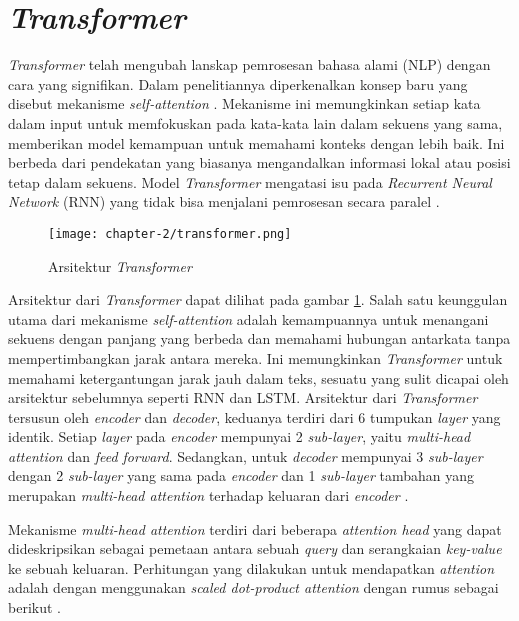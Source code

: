 \section{\textit{Transformer}}
\label{sec:transformer}

\textit{Transformer} telah mengubah lanskap pemrosesan bahasa alami (NLP) dengan cara yang signifikan. Dalam penelitiannya diperkenalkan konsep baru yang disebut mekanisme \textit{self-attention} \parencite{transformers}. Mekanisme ini memungkinkan setiap kata dalam input untuk memfokuskan pada kata-kata lain dalam sekuens yang sama, memberikan model kemampuan untuk memahami konteks dengan lebih baik. Ini berbeda dari pendekatan yang biasanya mengandalkan informasi lokal atau posisi tetap dalam sekuens. Model \textit{Transformer} mengatasi isu pada \textit{Recurrent Neural Network} (RNN) yang tidak bisa menjalani pemrosesan secara paralel \parencite{transformers}.

\begin{figure}[ht]
    \vspace{0.25cm}
    \centering
    \texttt{[image: chapter-2/transformer.png]}
    \caption{Arsitektur \textit{Transformer} \parencite{transformers}}
    \label{fig:transformer}
\end{figure}

Arsitektur dari \textit{Transformer} dapat dilihat pada gambar \ref{fig:transformer}. Salah satu keunggulan utama dari mekanisme \textit{self-attention} adalah kemampuannya untuk menangani sekuens dengan panjang yang berbeda dan memahami hubungan antarkata tanpa mempertimbangkan jarak antara mereka. Ini memungkinkan \textit{Transformer} untuk memahami ketergantungan jarak jauh dalam teks, sesuatu yang sulit dicapai oleh arsitektur sebelumnya seperti RNN dan LSTM. Arsitektur dari \textit{Transformer} tersusun oleh \textit{encoder} dan \textit{decoder}, keduanya terdiri dari 6 tumpukan \textit{layer} yang identik. Setiap \textit{layer} pada \textit{encoder} mempunyai 2 \textit{sub-layer}, yaitu \textit{multi-head attention} dan \textit{feed forward}. Sedangkan, untuk \textit{decoder} mempunyai 3 \textit{sub-layer} dengan 2 \textit{sub-layer} yang sama pada \textit{encoder} dan 1 \textit{sub-layer} tambahan yang merupakan \textit{multi-head attention} terhadap keluaran dari \textit{encoder} \parencite{transformers}.

Mekanisme \textit{multi-head attention} terdiri dari beberapa \textit{attention head} yang dapat dideskripsikan sebagai pemetaan antara sebuah \textit{query} dan serangkaian \textit{key-value} ke sebuah keluaran. Perhitungan yang dilakukan untuk mendapatkan \textit{attention} adalah dengan menggunakan \textit{scaled dot-product attention} dengan rumus sebagai berikut \parencite{transformers}.

